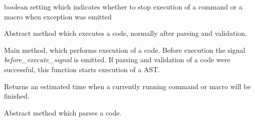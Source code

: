 \documentclass[letterpaper,10pt,english]{sphinxmanual}
\begin{document}
\begin{fulllineitems}
\begin{fulllineitems}
\end{fulllineitems}


\begin{fulllineitems}
\label{sysmod:pyfrid.modules.system.vm.core.vm.BaseVMModule.exc_stop}
boolean setting which indicates whether to stop execution of a command or a macro
when exception was emitted

\end{fulllineitems}


\begin{fulllineitems}
\label{sysmod:pyfrid.modules.system.vm.core.vm.BaseVMModule.execute_ast}
Abstract method which executes a code, normally after parsing and validation.

\end{fulllineitems}


\begin{fulllineitems}
\label{sysmod:pyfrid.modules.system.vm.core.vm.BaseVMModule.execute_code}
Main method, which performs execution of a code. Before execution the signal \emph{before\_execute\_signal}
is emitted. If parsing and validation of a code were successful, this function starts execution of a AST.

\end{fulllineitems}


\begin{fulllineitems}
\label{sysmod:pyfrid.modules.system.vm.core.vm.BaseVMModule.finishes}
Returns an estimated time when a currently running command or macro will be finished.

\end{fulllineitems}


\begin{fulllineitems}
\label{sysmod:pyfrid.modules.system.vm.core.vm.BaseVMModule.parse_code}
Abstract method which parses a code.


\end{fulllineitems}
\end{fulllineitems}
\end{document}
